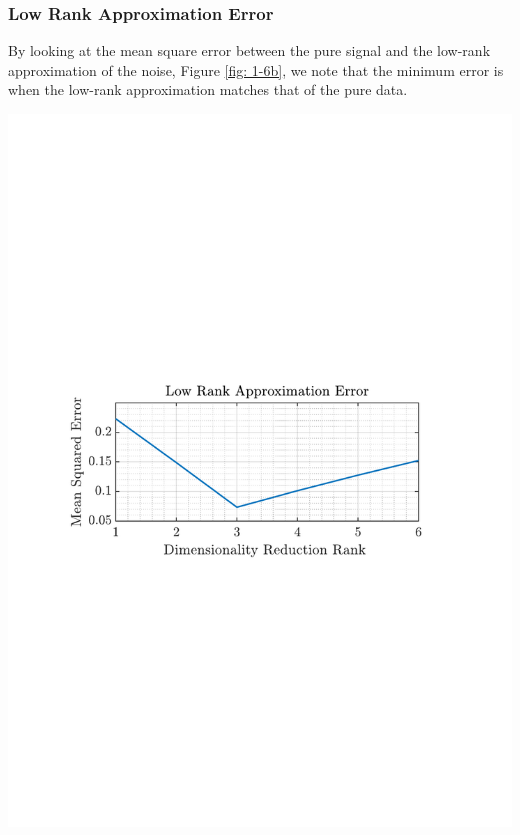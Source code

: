 \documentclass[12pt]{article}
\numberwithin{equation}{section}
\begin{document}
	 	
	 	\subsubsection{Low Rank Approximation Error}
		 	\begin{minipage}[b]{0.49\textwidth}
			By looking at the mean square error between the pure signal and the low-rank approximation of the noise, Figure \ref{fig: 1-6b}, we note that the minimum error is when the low-rank approximation matches that of the pure data.
			\end{minipage}%
			\begin{minipage}{0.04\textwidth}
				\hspace*{0.04\textwidth}
			\end{minipage}%
			\begin{minipage}{0.49\textwidth}
				\centering
				\includegraphics[trim={2.2cm 11.2cm 3.15cm  11.2cm}, clip, width=\textwidth]{../MATLAB/figures/q1_6b_fig01.pdf} 
				\captionsetup{justification=centering}
				\label{fig: 1-6b}
			\end{minipage}%
	
\end{document}
